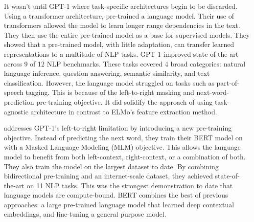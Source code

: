 \documentclass[11pt,a4paper,titlepage]{article}
\begin{document}
It wasn’t until GPT-1 where task-specific architectures begin to be discarded. Using a transformer architecture, \cite{radford2018improving} pre-trained a language model. Their use of transformers allowed the model to learn longer range dependencies in the text. They then use the entire pre-trained model as a base for supervised models. They showed that a pre-trained model, with little adaptation, can transfer learned representations to a multitude of NLP tasks. GPT-1 improved state-of-the art across 9 of 12 NLP benchmarks. These tasks covered 4 broad categories: natural language inference, question answering, semantic similarity, and text classification. However, the language model struggled on tasks such as part-of-speech tagging. This is because of the left-to-right masking and next-word-prediction pre-training objective. It did solidify the approach of using task-agnostic architecture in contrast to ELMo’s feature extraction method.

\cite{DBLP:journals/corr/abs-1810-04805} addresses GPT-1’s left-to-right limitation by introducing a new pre-training objective. Instead of predicting the next word, they train their BERT model on with a Masked Language Modeling (MLM) objective. This allows the language model to benefit from both left-context, right-context, or a combination of both. They also train the model on the largest dataset to date. By combining bidirectional pre-training and an internet-scale dataset, they achieved state-of-the-art on 11 NLP tasks. This was the strongest demonstration to date that language models are compute-bound. BERT combines the best of previous approaches: a large pre-trained language model that learned deep contextual embeddings, and fine-tuning a general purpose model.


















\end{document}
